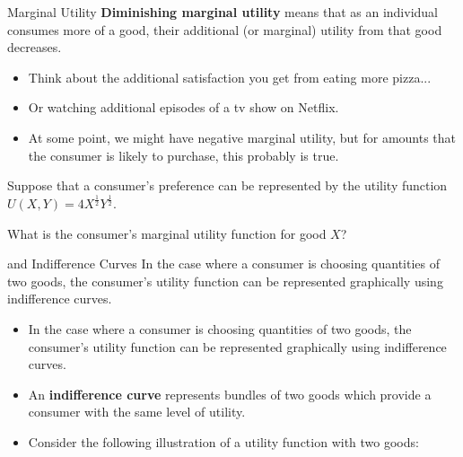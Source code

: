 \documentclass[12pt,t]{beamer}
\begin{document}
\begin{frame}{Marginal Utility}
  \textbf{Diminishing marginal utility} means that as an individual consumes more of a good, their additional (or marginal) utility from that good decreases.

  \begin{itemize}
    \item Think about the additional satisfaction you get from eating more pizza...

    \item Or watching additional episodes of a tv show on Netflix.

    \pause
    \item At some point, we might have negative marginal utility, but for amounts that the consumer is likely to purchase, this probably is true.
  \end{itemize}
\end{frame}

\begin{frame}

  \bigskip
  Suppose that a consumer's preference can be represented by the utility function $U(X,Y) = 4X^\frac{1}{2} Y^\frac{1}{2}$. 
  
  What is the consumer's marginal utility function for good $X$?
\end{frame}

\begin{frame}{ and Indifference Curves}
  In the case where a consumer is choosing quantities of two goods, the consumer's utility function can be represented graphically using indifference curves.

  \begin{itemize}
    \item In the case where a consumer is choosing quantities of two goods, the consumer's utility function can be represented graphically using indifference curves.

    \item An \textbf{indifference curve} represents bundles of two goods which provide a consumer with the same level of utility.

    \item Consider the following illustration of a utility function with two goods: 
  \end{itemize}
\end{frame}
\end{document}
